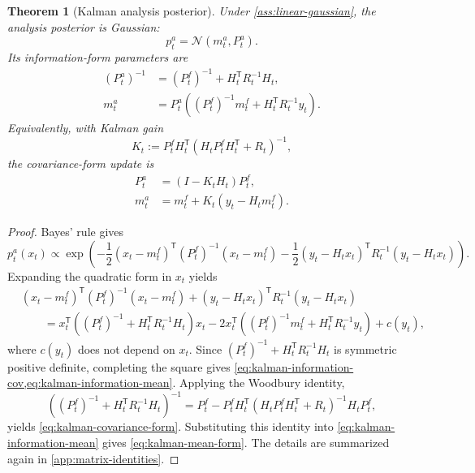 \documentclass[11pt]{article}
\newcommand{\Id}{I}
\newcommand{\parens}[1]{\left( #1 \right)}
\newcommand{\transpose}{^{\mathsf T}}
\numberwithin{equation}{section}
\theoremstyle{plain}
\newtheorem{theorem}{Theorem}[section]
\theoremstyle{definition}
\theoremstyle{remark}
\begin{document}
\begin{theorem}[Kalman analysis posterior]
\label{thm:kalman-posterior}
Under \cref{ass:linear-gaussian}, the analysis posterior is Gaussian:
\begin{equation}
p_t^a = \mathcal N(m_t^a,P_t^a).
\end{equation}
Its information-form parameters are
\begin{align}
\parens{P_t^a}^{-1} &= \parens{P_t^f}^{-1} + H_t\transpose R_t^{-1}H_t, \label{eq:kalman-information-cov}\\
m_t^a &= P_t^a\parens{\parens{P_t^f}^{-1}m_t^f + H_t\transpose R_t^{-1}y_t}. \label{eq:kalman-information-mean}
\end{align}
Equivalently, with Kalman gain
\begin{equation}
K_t := P_t^fH_t\transpose\parens{H_tP_t^fH_t\transpose + R_t}^{-1},
\label{eq:kalman-gain}
\end{equation}
the covariance-form update is
\begin{align}
P_t^a &= \parens{\Id-K_tH_t}P_t^f, \label{eq:kalman-covariance-form}\\
m_t^a &= m_t^f + K_t\parens{y_t-H_tm_t^f}. \label{eq:kalman-mean-form}
\end{align}
\end{theorem}

\begin{proof}
Bayes' rule gives
\[
p_t^a(x_t)
\propto
\exp\!\left(
-\frac12(x_t-m_t^f)\transpose (P_t^f)^{-1}(x_t-m_t^f)
-\frac12(y_t-H_tx_t)\transpose R_t^{-1}(y_t-H_tx_t)
\right).
\]
Expanding the quadratic form in $x_t$ yields
\begin{align*}
&(x_t-m_t^f)\transpose (P_t^f)^{-1}(x_t-m_t^f)
+(y_t-H_tx_t)\transpose R_t^{-1}(y_t-H_tx_t) \\
&\qquad=
x_t\transpose\parens{(P_t^f)^{-1}+H_t\transpose R_t^{-1}H_t}x_t
-2x_t\transpose\parens{(P_t^f)^{-1}m_t^f + H_t\transpose R_t^{-1}y_t}
+c(y_t),
\end{align*}
where $c(y_t)$ does not depend on $x_t$. Since $(P_t^f)^{-1}+H_t\transpose R_t^{-1}H_t$ is symmetric positive definite, completing the square gives \cref{eq:kalman-information-cov,eq:kalman-information-mean}. Applying the Woodbury identity,
\[
\parens{(P_t^f)^{-1}+H_t\transpose R_t^{-1}H_t}^{-1}
=
P_t^f - P_t^fH_t\transpose\parens{H_tP_t^fH_t\transpose+R_t}^{-1}H_tP_t^f,
\]
yields \cref{eq:kalman-covariance-form}. Substituting this identity into \cref{eq:kalman-information-mean} gives \cref{eq:kalman-mean-form}. The details are summarized again in \cref{app:matrix-identities}.
\end{proof}
\end{document}
